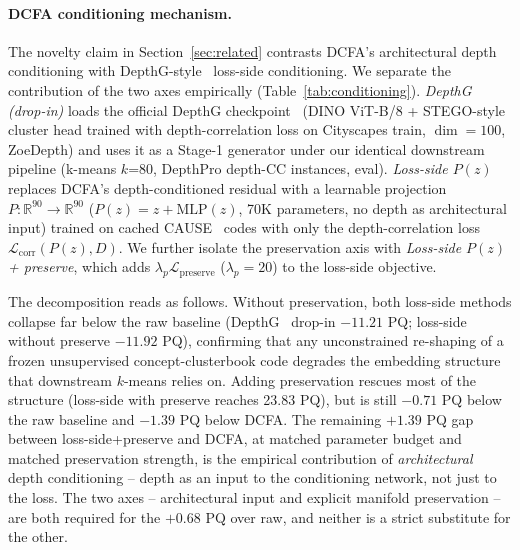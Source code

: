 \documentclass{article}
\begin{document}
\paragraph{DCFA conditioning mechanism.}
The novelty claim in Section~\ref{sec:related} contrasts DCFA's architectural depth conditioning with DepthG-style~\cite{sick2024depthg} loss-side conditioning. We separate the contribution of the two axes empirically (Table~\ref{tab:conditioning}). \emph{DepthG~\cite{sick2024depthg} (drop-in)} loads the official DepthG checkpoint~\cite{sick2024depthg} (DINO ViT-B/8 + STEGO-style cluster head trained with depth-correlation loss on Cityscapes train, $\dim{=}100$, ZoeDepth) and uses it as a Stage-1 generator under our identical downstream pipeline (k-means $k$=80, DepthPro depth-CC instances, eval). \emph{Loss-side $P(z)$} replaces DCFA's depth-conditioned residual with a learnable projection $P : \mathbb{R}^{90} \to \mathbb{R}^{90}$ ($P(z) = z + \text{MLP}(z)$, 70K parameters, no depth as architectural input) trained on cached CAUSE~\cite{kim2024cause} codes with only the depth-correlation loss $\mathcal{L}_\text{corr}(P(z), D)$. We further isolate the preservation axis with \emph{Loss-side $P(z)$ + preserve}, which adds $\lambda_p \mathcal{L}_\text{preserve}$ ($\lambda_p=20$) to the loss-side objective.

The decomposition reads as follows. Without preservation, both loss-side methods collapse far below the raw baseline (DepthG~\cite{sick2024depthg} drop-in $-11.21$ PQ; loss-side without preserve $-11.92$ PQ), confirming that any unconstrained re-shaping of a frozen unsupervised concept-clusterbook code degrades the embedding structure that downstream $k$-means relies on. Adding preservation rescues most of the structure (loss-side with preserve reaches 23.83 PQ), but is still $-0.71$ PQ below the raw baseline and $-1.39$ PQ below DCFA. The remaining $+1.39$ PQ gap between loss-side+preserve and DCFA, at matched parameter budget and matched preservation strength, is the empirical contribution of \emph{architectural} depth conditioning -- depth as an input to the conditioning network, not just to the loss. The two axes -- architectural input and explicit manifold preservation -- are both required for the $+0.68$ PQ over raw, and neither is a strict substitute for the other.
\end{document}
